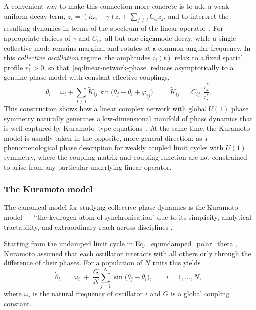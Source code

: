 \documentclass[11pt]{article}
\numberwithin{equation}{section}
\begin{document}
A convenient way to make this connection more concrete is to add a weak uniform decay term, $\dot z_i = (i\omega_i - \gamma) z_i + \sum_{j\neq i} C_{ij}z_j$, and to interpret the resulting dynamics in terms of the spectrum of the linear operator~\cite{Roberts2008,Conteville2013}. For appropriate choices of $\gamma$ and $C_{ij}$, all but one eigenmode decay, while a single collective mode remains marginal and rotates at a common angular frequency. In this \emph{collective oscillation} regime, the amplitudes $r_i(t)$ relax to a fixed spatial profile $r_i^\ast>0$, so that~\eqref{eq:linear-network-phase} reduces asymptotically to a genuine phase model with constant effective couplings,
\begin{equation}
    \dot\theta_i
    =
    \omega_i
    +
    \sum_{j\neq i}
      \tilde K_{ij}\,
      \sin\!\bigl(\theta_j-\theta_i+\varphi_{ij}\bigr),
    \qquad
    \tilde K_{ij} = |C_{ij}|\,\frac{r_j^\ast}{r_i^\ast}.
    \label{eq:kuramoto-effective-coupling}
\end{equation}
This construction shows how a linear complex network with global $U(1)$ phase symmetry naturally generates a low‑dimensional manifold of phase dynamics that is well captured by Kuramoto–type equations~\cite{Kuramoto1984,Nakao2016,Pietras2019}. At the same time, the Kuramoto model is usually taken in the opposite, more general direction: as a phenomenological phase description for weakly coupled limit cycles with $U(1)$ symmetry, where the coupling matrix and coupling function are not constrained to arise from any particular underlying linear operator.




\subsubsection{The Kuramoto model}
 

The canonical model for studying collective phase dynamics is the Kuramoto model ---  “the hydrogen atom of synchronisation” due to its simplicity, analytical tractability, and extraordinary reach across disciplines 
\cite{kuramotoSelfentrainmentPopulationCoupled1975,Winfree2001,strogatz_nonlinear_2015,acebronKuramotoModelSimple2005}. %

Starting from the undamped limit cycle in Eq.~\eqref{eq:undamped_polar_theta}, Kuramoto assumed that each oscillator interacts with all others only through the difference of their phases.  For a population of $N$ units this yields  
\begin{equation}
    \dot{\theta}_{i}
    \;=\;
    \omega_{i}
    \;+\;
    \frac{G}{N}
    \sum_{j=1}^{N}
    \sin\!\bigl(\theta_{j}-\theta_{i}\bigr),
    \qquad
    i=1,\dots,N,
    \label{eq:kuramoto_original}
\end{equation}
where $\omega_{i}$ is the natural frequency of oscillator $i$ and $G$ is a global coupling constant.
\end{document}
